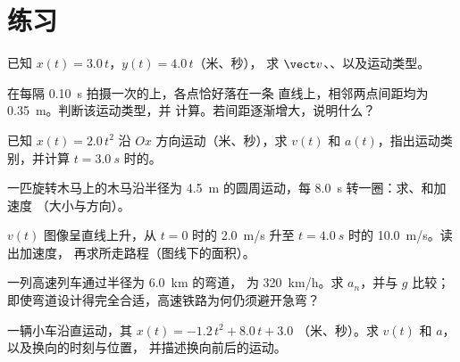 \section{练习}

\begin{exercise}[$\star$]\label{exo:g12:kinematics-2d:1}
已知 $x(t) = 3.0\,t$，$y(t) = 4.0\,t$（米、秒），
求 $\vect v$、、以及运动类型。
\end{exercise}

\begin{exercise}[$\star$]\label{exo:g12:kinematics-2d:2}
在每隔 \qty{0.10}{s} 拍摄一次的上，各点恰好落在一条
直线上，相邻两点间距均为 \qty{0.35}{m}。判断该运动类型，并
计算。若间距逐渐增大，说明什么？
\end{exercise}

\begin{exercise}[$\star$]\label{exo:g12:kinematics-2d:3}
已知 $x(t) = 2.0\,t^2$ 沿 $Ox$ 方向运动（米、秒），求 $v(t)$
和 $a(t)$，指出运动类别，并计算
$t = \qty{3.0}{s}$ 时的。
\end{exercise}

\begin{exercise}[$\star$]\label{exo:g12:kinematics-2d:4}
一匹旋转木马上的木马沿半径为 \qty{4.5}{m} 的圆周运动，每
\qty{8.0}{s} 转一圈：求、和加速度
（大小与方向）。
\end{exercise}

\begin{exercise}[$\star$]\label{exo:g12:kinematics-2d:5}
$v(t)$ 图像呈直线上升，从 $t = 0$ 时的 \qty{2.0}{m/s}
升至 $t = \qty{4.0}{s}$ 时的 \qty{10.0}{m/s}。读出加速度，
再求所走路程（图线下的面积）。
\end{exercise}

\begin{exercise}[$\star\star$]\label{exo:g12:kinematics-2d:6}
一列高速列车通过半径为 \qty{6.0}{km} 的弯道，
为 \qty{320}{km/h}。求 $a_n$，并与 $g$ 比较；
即使弯道设计得完全合适，高速铁路为何仍须避开急弯？
\end{exercise}

\begin{exercise}[$\star\star$]\label{exo:g12:kinematics-2d:7}
一辆小车沿直运动，其 $x(t) = -1.2\,t^2 + 8.0\,t + 3.0$
（米、秒）。求 $v(t)$ 和 $a$，以及换向的时刻与位置，
并描述换向前后的运动。
\end{exercise}

